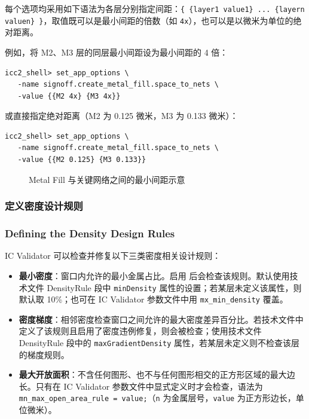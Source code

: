 每个选项均采用如下语法为各层分别指定间距：\texttt{\{ \{layer1 value1\} ... \{layern valuen\} \}}，取值既可以是最小间距的倍数（如 \texttt{4x}），也可以是以微米为单位的绝对距离。

例如，将 M2、M3 层的同层最小间距设为最小间距的 4 倍：
\begin{lstlisting}
icc2_shell> set_app_options \
   -name signoff.create_metal_fill.space_to_nets \
   -value {{M2 4x} {M3 4x}}
\end{lstlisting}

或直接指定绝对距离（M2 为 0.125 微米，M3 为 0.133 微米）：
\begin{lstlisting}
icc2_shell> set_app_options \
   -name signoff.create_metal_fill.space_to_nets \
   -value {{M2 0.125} {M3 0.133}}
\end{lstlisting}

\begin{figure}[htbp]
\centering
{}
\caption{Metal Fill 与关键网络之间的最小间距示意}
\label{fig:fill-net-spacing}
\end{figure}

\subsubsection{定义密度设计规则}
\subsubsection*{Defining the Density Design Rules}

IC Validator 可以检查并修复以下三类密度相关设计规则：
\begin{itemize}
  \item \textbf{最小密度}：窗口内允许的最小金属占比。启用  后会检查该规则。默认使用技术文件 DensityRule 段中 \texttt{minDensity} 属性的设置；若某层未定义该属性，则默认取 10\%；也可在 IC Validator 参数文件中用 \texttt{mx\_min\_density} 覆盖。
  \item \textbf{密度梯度}：相邻密度检查窗口之间允许的最大密度差异百分比。若技术文件中定义了该规则且启用了密度违例修复，则会被检查；使用技术文件 DensityRule 段中的 \texttt{maxGradientDensity} 属性，若某层未定义则不检查该层的梯度规则。
  \item \textbf{最大开放面积}：不含任何图形、也不与任何图形相交的正方形区域的最大边长。只有在 IC Validator 参数文件中显式定义时才会检查，语法为 \texttt{mn\_max\_open\_area\_rule = value;}（\texttt{n} 为金属层号，\texttt{value} 为正方形边长，单位微米）。
\end{itemize}

